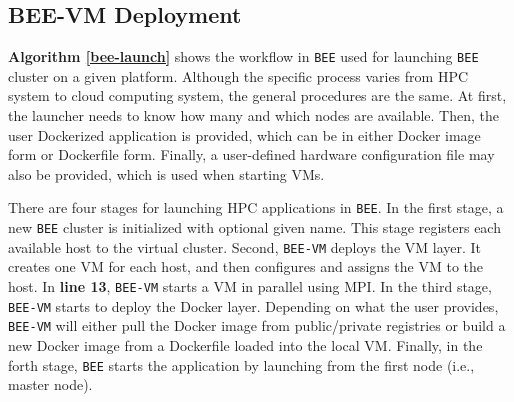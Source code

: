 
\subsection{BEE-VM Deployment}
\textbf{Algorithm \ref{bee-launch}} shows the workflow in \texttt{BEE} used for launching \texttt{BEE} cluster on a given platform. Although the specific process varies from HPC system to cloud computing system, the general procedures are the same. At first, the launcher needs to know how many and which nodes are available. Then, the user Dockerized application is provided, which can be in either Docker image form or Dockerfile form. Finally, a user-defined hardware configuration file may also be provided, which is used when starting VMs. 

There are four stages for launching HPC applications in \texttt{BEE}. In the first stage, a new \texttt{BEE} cluster is initialized with optional given name. This stage registers each available host to the virtual cluster. Second, \texttt{BEE-VM} deploys the VM layer. It creates one VM for each host, and then configures and assigns the VM to the  host. In \textbf{line 13}, \texttt{BEE-VM} starts a VM in parallel using MPI. In the third stage, \texttt{BEE-VM} starts to deploy the Docker layer. Depending on what the user provides, \texttt{BEE-VM} will either pull the Docker image from public/private registries or build a new Docker image from a Dockerfile loaded into the local VM. Finally, in the forth stage, \texttt{BEE} starts the application by launching from the first node (i.e., master node).


